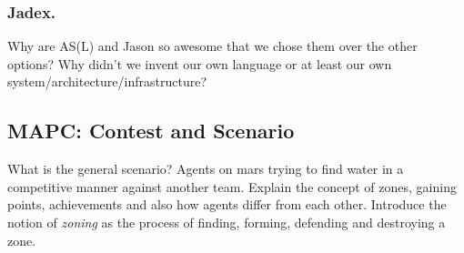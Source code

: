\subsubsection{Jadex.}




Why are AS(L) and Jason so awesome that we chose them over the other options? Why didn't we invent our own language or at least our own system/architecture/infrastructure?

\subsection{MAPC: Contest and Scenario}
What is the general scenario? Agents on mars trying to find water in a competitive manner against another team. Explain the concept of zones, gaining points, achievements and also how agents differ from each other. Introduce the notion of \emph{zoning} as the process of finding, forming, defending and destroying a zone.
